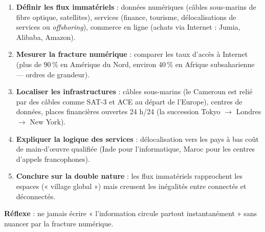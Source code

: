 \documentclass[11pt]{article}
\begin{document}
\begin{methode}
\begin{enumerate}
\item \textbf{Définir les flux immatériels} : données numériques (câbles sous-marins de fibre optique, satellites), services (finance, tourisme, délocalisations de services ou \emph{offshoring}), commerce en ligne (achats via Internet : Jumia, Alibaba, Amazon).
\item \textbf{Mesurer la fracture numérique} : comparer les taux d'accès à Internet (plus de $90\,\%$ en Amérique du Nord, environ $40\,\%$ en Afrique subsaharienne — ordres de grandeur).
\item \textbf{Localiser les infrastructures} : câbles sous-marins (le Cameroun est relié par des câbles comme SAT-3 et ACE au départ de l'Europe), centres de données, places financières ouvertes 24 h/24 (la succession Tokyo $\rightarrow$ Londres $\rightarrow$ New York).
\item \textbf{Expliquer la logique des services} : délocalisation vers les pays à bas coût de main-d'œuvre qualifiée (Inde pour l'informatique, Maroc pour les centres d'appels francophones).
\item \textbf{Conclure sur la double nature} : les flux immatériels rapprochent les espaces (« village global ») mais creusent les inégalités entre connectés et déconnectés.
\end{enumerate}
\textbf{Réflexe} : ne jamais écrire « l'information circule partout instantanément » sans nuancer par la fracture numérique.
\end{methode}
\end{document}

